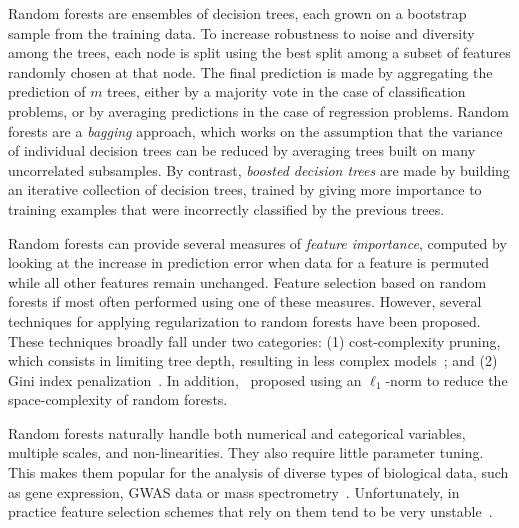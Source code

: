 	    Random forests are ensembles of decision trees, each grown on a bootstrap sample from the training data.
	    To increase robustness to noise and diversity among the trees, each node is split using the best split among a subset of features randomly chosen at that node.
	    The final prediction is made by aggregating the prediction of $m$ trees, either by a majority vote in the case of classification problems, or by averaging predictions in the case of regression problems.
	    Random forests are a {\it bagging} approach, which works on the assumption that the variance of individual decision trees can be reduced by averaging trees built on many uncorrelated subsamples.
	    By contrast, {\it boosted decision trees} are made by building an iterative collection of decision trees, trained by giving more importance to training examples that were incorrectly classified by the previous trees. 

	    Random forests can provide several measures of {\it feature importance}, computed by looking at the increase in prediction error %
	    when data for a feature is permuted while all other features remain unchanged. Feature selection based on random forests if most often performed using one of these measures. However, several techniques for applying regularization to random forests have been proposed. These techniques broadly fall under two categories: (1) cost-complexity pruning, which consists in limiting tree depth, resulting in less complex models~\cite{ishwaran2008random,kulkarni2012pruning}; and (2) Gini index penalization~\cite{deng2013gene, liu2014learning}. In addition,~\cite{joly2012ell1} proposed using an $\ell_1$-norm  to reduce the space-complexity of random forests.

	    Random forests naturally handle both numerical and categorical variables, multiple scales, and non-linearities. They also require little parameter tuning. This makes them popular for the analysis of diverse types of biological data, such as gene expression, GWAS data or mass spectrometry~\cite{qi2012random}. Unfortunately, in practice feature selection schemes that rely on them tend to be very unstable~\cite{kursa2014robustness}.

